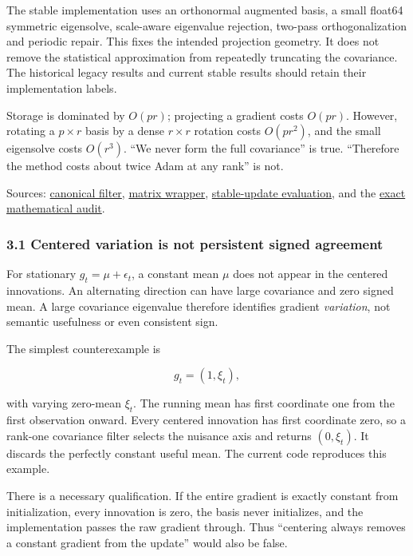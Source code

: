 \documentclass[
  british,
  10pt,
  a4paper,
]{article}
\begin{document}
The stable implementation uses an orthonormal augmented basis, a small
float64 symmetric eigensolve,\allowbreak{} scale-\allowbreak{}aware
eigenvalue rejection, two-pass orthogonalization and periodic repair.
This fixes the intended projection geometry. It does not remove the
statistical approximation from repeatedly truncating the
covariance.\allowbreak{} The historical legacy results and current
stable results should retain their implementation labels.

Storage is dominated by \(O(pr)\); projecting a gradient costs
\(O(pr)\). However, rotating a \(p\times r\) basis by a dense
\(r\times r\) rotation costs \(O(pr^2)\), and the small eigensolve costs
\(O(r^3)\). ``We never form the full covariance'' is true. ``Therefore
the method costs about twice Adam at any rank'' is not.

Sources: \href{../../../spectral_filter.py}{canonical filter},
\href{../../../matrix_spectral_filter.py}{matrix wrapper},
\href{../../../research/stable_filter_evaluation.md}{stable-\allowbreak{}update
evaluation}, and the \hyperref[mathematical-audit]{exact mathematical
audit}.

\subsubsection{3.1 Centered variation is not persistent signed
agreement}\label{synthesis--centered-variation-is-not-persistent-signed-agreement}

For stationary \(g_t=\mu+\epsilon_t\), a constant mean \(\mu\) does not
appear in the centered innovations.\allowbreak{} An alternating
direction can have large covariance and zero signed mean. A large
covariance eigenvalue therefore identifies gradient \emph{variation},
not semantic usefulness or even consistent sign.

The simplest counterexample is

\[
g_t=(1,\xi_t),
\]

with varying zero-mean \(\xi_t\). The running mean has first coordinate
one from the first observation onward. Every centered innovation has
first coordinate zero, so a rank-one covariance filter selects the
nuisance axis and returns \((0,\xi_t)\). It discards the perfectly
constant useful mean. The current code reproduces this example.

There is a necessary qualificatio\allowbreak{}n.\allowbreak{} If the
entire gradient is exactly constant from
initializati\allowbreak{}on,\allowbreak{} every innovation is zero, the
basis never initializes,\allowbreak{} and the implementation passes the
raw gradient through. Thus ``centering always removes a constant
gradient from the update'' would also be false.
\end{document}
